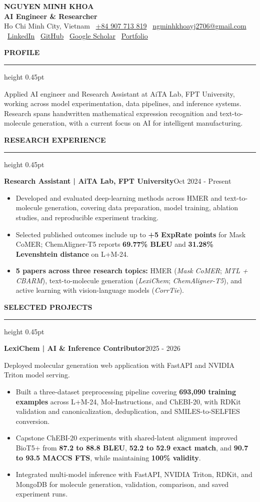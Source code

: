 \documentclass[10pt]{article}
\newcommand{\cvsection}[1]{%
    \vspace{6.2pt}%
    {\color{accent}\bfseries\small #1}\par
    \vspace{2.3pt}%
    {\color{rulegray}\hrule height 0.45pt}\vspace{4.0pt}%
}
\newcommand{\entry}[2]{%
    \textbf{#1}\hfill {\color{muted}\small #2}\par
}
\newcommand{\subentry}[1]{%
    {\color{muted}\small #1}\par
}
\begin{document}
\begin{center}
    {\LARGE\textbf{NGUYEN MINH KHOA}}\\[-1pt]
    {\color{accent}\textbf{AI Engineer \& Researcher}}\\[3pt]
    {\small Ho Chi Minh City, Vietnam \textbullet\
    \href{tel:+84907713819}{+84 907 713 819} \textbullet\
    \href{mailto:ngminhkhoayj2706@gmail.com}{ngminhkhoayj2706@gmail.com} \textbullet\
    \href{https://www.linkedin.com/in/ngminhkhoa1410}{LinkedIn} \textbullet\
    \href{https://github.com/Purin1410}{GitHub} \textbullet\
    \href{https://scholar.google.com/citations?user=tCq7yoQAAAAJ}{Google Scholar} \textbullet\
    \href{https://purin1410.github.io}{Portfolio}}
\end{center}

\vspace{-2pt}

\cvsection{PROFILE}
Applied AI engineer and Research Assistant at AiTA Lab, FPT University, working across model experimentation, data pipelines, and inference systems. Research spans handwritten mathematical expression recognition and text-to-molecule generation, with a current focus on AI for intelligent manufacturing.

\cvsection{RESEARCH EXPERIENCE}
\entry{Research Assistant | AiTA Lab, FPT University}{Oct 2024 - Present}
\begin{itemize}
    \item Developed and evaluated deep-learning methods across HMER and text-to-molecule generation, covering data preparation, model training, ablation studies, and reproducible experiment tracking.
    \item Selected published outcomes include up to \textbf{+5 ExpRate points} for Mask CoMER; ChemAligner-T5 reports \textbf{69.77\% BLEU} and \textbf{31.28\% Levenshtein distance} on L+M-24.
    \item \textbf{5 papers across three research topics:} HMER (\textit{Mask CoMER}; \textit{MTL + CBARM}), text-to-molecule generation (\textit{LexiChem}; \textit{ChemAligner-T5}), and active learning with vision-language models (\textit{CorrTie}).
\end{itemize}

\cvsection{SELECTED PROJECTS}
\entry{LexiChem | AI \& Inference Contributor}{2025 - 2026}
\subentry{Deployed molecular generation web application with FastAPI and NVIDIA Triton model serving.}
\begin{itemize}
    \item Built a three-dataset preprocessing pipeline covering \textbf{693,090 training examples} across L+M-24, Mol-Instructions, and ChEBI-20, with RDKit validation and canonicalization, deduplication, and SMILES-to-SELFIES conversion.
    \item Capstone ChEBI-20 experiments with shared-latent alignment improved BioT5+ from \textbf{87.2 to 88.8 BLEU}, \textbf{52.2 to 52.9 exact match}, and \textbf{90.7 to 93.5 MACCS FTS}, while maintaining \textbf{100\% validity}.
    \item Integrated multi-model inference with FastAPI, NVIDIA Triton, RDKit, and MongoDB for molecule generation, validation, comparison, and saved experiment runs.
\end{itemize}
\end{document}

